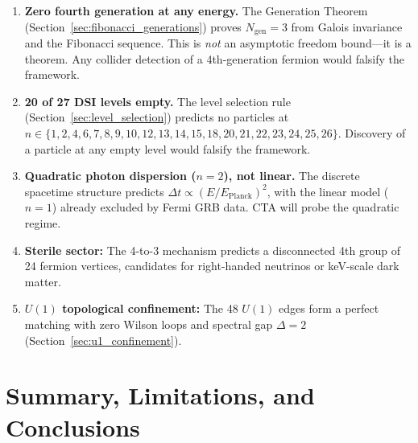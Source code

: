 \documentclass[12pt,a4paper]{article}
\begin{document}
\begin{enumerate}
    \item \textbf{Zero fourth generation at any energy.} The Generation Theorem (Section~\ref{sec:fibonacci_generations}) proves $N_{\text{gen}} = 3$ from Galois invariance and the Fibonacci sequence. This is \emph{not} an asymptotic freedom bound---it is a theorem. Any collider detection of a 4th-generation fermion would falsify the framework.

    \item \textbf{20 of 27 DSI levels empty.} The level selection rule (Section~\ref{sec:level_selection}) predicts no particles at $n \in \{1,2,4,6,7,8,9,10,12,13,14,15,18,20,21,22,23,24,25,26\}$. Discovery of a particle at any empty level would falsify the framework.

    \item \textbf{Quadratic photon dispersion ($n=2$), not linear.} The discrete spacetime structure predicts $\Delta t \propto (E/E_{\text{Planck}})^2$, with the linear model ($n=1$) already excluded by Fermi GRB data. CTA will probe the quadratic regime.

    \item \textbf{Sterile sector:} The 4-to-3 mechanism predicts a disconnected 4th group of 24 fermion vertices, candidates for right-handed neutrinos or keV-scale dark matter.

    \item \textbf{$U(1)$ topological confinement:} The 48 $U(1)$ edges form a perfect matching with zero Wilson loops and spectral gap $\Delta = 2$ (Section~\ref{sec:u1_confinement}).
\end{enumerate}

\section{Summary, Limitations, and Conclusions}
\label{sec:conclusions}
\end{document}
